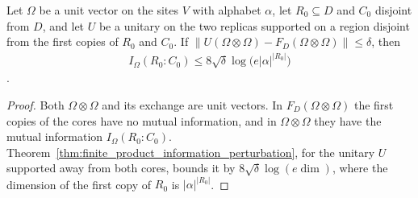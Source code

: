 \begin{theorem}
    \label{thm:gaussian_reset_entropy}
    \leanok
    Let $\Omega$ be a unit vector on the sites $V$ with alphabet $\alpha$, let
    $R_0\subseteq D$ and $C_0$ disjoint from $D$, and let $U$ be a unitary on the two
    replicas supported on a region disjoint from the first copies of $R_0$ and $C_0$.
    If $\lVert U(\Omega\otimes\Omega)-F_D(\Omega\otimes\Omega)\rVert\le\delta$, then
    \begin{align}
        I_\Omega(R_0:C_0)\le8\sqrt\delta\log\bigl(e\lvert\alpha\rvert^{\lvert R_0\rvert}\bigr)
    \end{align}
    \cite[Lemma~3.3]{OpenAI2026PolynomialPEPS}.
\end{theorem}
\begin{proof}\leanok
    Both $\Omega\otimes\Omega$ and its exchange are unit vectors. In
    $F_D(\Omega\otimes\Omega)$ the first copies of the cores have no mutual information,
    and in $\Omega\otimes\Omega$ they have the mutual information $I_\Omega(R_0:C_0)$.
    Theorem~\ref{thm:finite_product_information_perturbation}, for the unitary $U$
    supported away from both cores, bounds it by $8\sqrt\delta\log(e\dim)$, where the
    dimension of the first copy of $R_0$ is $\lvert\alpha\rvert^{\lvert R_0\rvert}$.
\end{proof}
